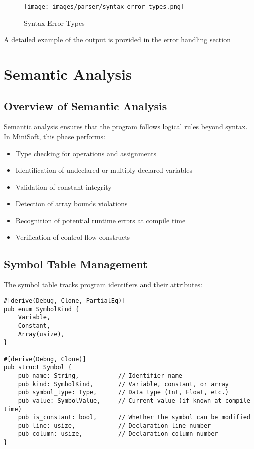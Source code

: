 \documentclass[12pt,a4paper]{article}
\begin{document}
\begin{figure}[H]
	\centering
	\texttt{[image: images/parser/syntax-error-types.png]}
	\caption{Syntax Error Types}
\end{figure}

A detailed example of the output is provided in the error handling section

\section{Semantic Analysis}
\subsection{Overview of Semantic Analysis}
Semantic analysis ensures that the program follows logical rules beyond syntax. In MiniSoft, this phase performs:

\begin{itemize}
	\item Type checking for operations and assignments
	\item Identification of undeclared or multiply-declared variables
	\item Validation of constant integrity
	\item Detection of array bounds violations
	\item Recognition of potential runtime errors at compile time
	\item Verification of control flow constructs
\end{itemize}

\subsection{Symbol Table Management}
The symbol table tracks program identifiers and their attributes:

\begin{lstlisting}[caption={Symbol Table Structure}]
#[derive(Debug, Clone, PartialEq)]
pub enum SymbolKind {
    Variable,
    Constant,
    Array(usize),
}

#[derive(Debug, Clone)]
pub struct Symbol {
    pub name: String,           // Identifier name
    pub kind: SymbolKind,       // Variable, constant, or array
    pub symbol_type: Type,      // Data type (Int, Float, etc.)
    pub value: SymbolValue,     // Current value (if known at compile time)
    pub is_constant: bool,      // Whether the symbol can be modified
    pub line: usize,            // Declaration line number
    pub column: usize,          // Declaration column number
}
\end{lstlisting}
\end{document}
